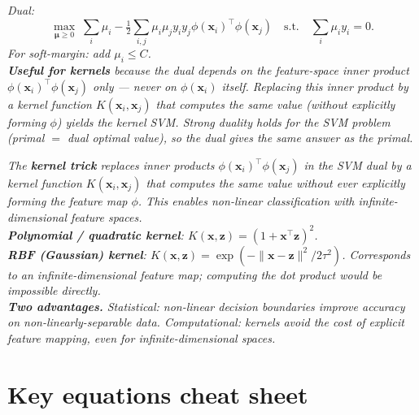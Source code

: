 \documentclass[11pt, a4paper]{article}
\begin{document}
\begin{exambox}
\textit{Dual:}
\[
\max_{\boldsymbol\mu \ge 0}\;\sum_i \mu_i - \tfrac{1}{2}\sum_{i,j}\mu_i\mu_j y_i y_j \phi(\mathbf{x}_i)^\top\phi(\mathbf{x}_j) \quad\text{s.t.}\quad \sum_i \mu_i y_i = 0.
\]
\textit{For soft-margin: add $\mu_i \le C$.}\\[0.3em]
\textit{\textbf{Useful for kernels} because the dual depends on the feature-space inner product $\phi(\mathbf{x}_i)^\top\phi(\mathbf{x}_j)$ only — never on $\phi(\mathbf{x}_i)$ itself. Replacing this inner product by a kernel function $K(\mathbf{x}_i, \mathbf{x}_j)$ that computes the same value (without explicitly forming $\phi$) yields the kernel SVM. Strong duality holds for the SVM problem (primal $=$ dual optimal value), so the dual gives the same answer as the primal.}
\end{exambox}

\begin{exambox}
\textit{The \textbf{kernel trick} replaces inner products $\phi(\mathbf{x}_i)^\top\phi(\mathbf{x}_j)$ in the SVM dual by a kernel function $K(\mathbf{x}_i, \mathbf{x}_j)$ that computes the same value without ever explicitly forming the feature map $\phi$. This enables non-linear classification with infinite-dimensional feature spaces.}\\[0.3em]
\textit{\textbf{Polynomial / quadratic kernel}: $K(\mathbf{x}, \mathbf{z}) = (1 + \mathbf{x}^\top\mathbf{z})^2$.}\\[0.3em]
\textit{\textbf{RBF (Gaussian) kernel}: $K(\mathbf{x}, \mathbf{z}) = \exp(-\|\mathbf{x}-\mathbf{z}\|^2 / 2\tau^2)$. Corresponds to an infinite-dimensional feature map; computing the dot product would be impossible directly.}\\[0.3em]
\textit{\textbf{Two advantages.} Statistical: non-linear decision boundaries improve accuracy on non-linearly-separable data. Computational: kernels avoid the cost of explicit feature mapping, even for infinite-dimensional spaces.}
\end{exambox}

\section*{Key equations cheat sheet}
\end{document}
